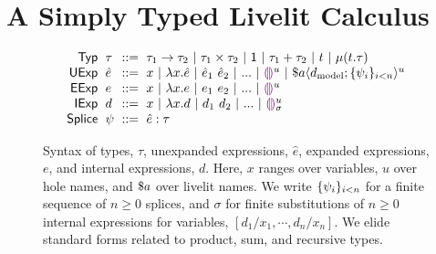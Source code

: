 \section{A Simply Typed Livelit Calculus}\label{sec:livelit-calculus}

\begin{figure}
    \vspace{-3px}
    \[
    \arraycolsep=3pt\begin{array}{rlcl}
        \mathsf{Typ} & \tau & ::= &
                                    \tarr{\tau_1}{\tau_2} ~\vert~
                                    \tprod{\tau_1}{\tau_2} ~\vert~
                                    \tunit ~\vert~
                                    \tsum{\tau_1}{\tau_2} ~\vert~
                                    t ~\vert~
                                    \trec{t}{\tau}\\
        \mathsf{UExp} & \hat{e} & ::= & 
                                 x ~\vert~
                                 \hlam{x}{\hat e} ~\vert~
                                 \hap{\hat e_1}{\hat e_2} ~\vert~
                                 ... ~\vert~
                                 \hehole{u} ~\vert~
                                 \haplivelit{u}{a}{\dtxt{model}}{\splices}\\
        \mathsf{EExp} & e & ::= & x ~\vert~ \hlam{x}{e} ~\vert~ \hap{e_1}{e_2} ~\vert~ ... ~\vert~ \hehole{u}\\
        \mathsf{IExp} & d & ::= & x ~\vert~ \hlam{x}{d} ~\vert~ \hap{d_1}{d_2} ~\vert~ ... ~\vert~ \dehole{u}{\sigma}\\
        \mathsf{Splice} & \psi & ::= & \hsplice{\hat e}{\tau}
    \end{array}\]
    \caption{Syntax of types, $\tau$, unexpanded expressions, $\hat{e}$, expanded expressions, $e$, and internal expressions, $d$.
    Here, $x$ ranges over variables, $u$ over hole names, and $\$a$ over livelit names.
    We write $\{\psi_i\}_{i < n}$ for a finite sequence of $n \geq 0$ splices,
    and $\sigma$ for finite substitutions of $n \geq 0$ internal expressions for variables, $[d_1/x_1, \cdots, d_n/x_n]$.
    We elide standard forms
    related to product, sum, and recursive types.
    }
    \label{fig:syntax}
    \end{figure}

